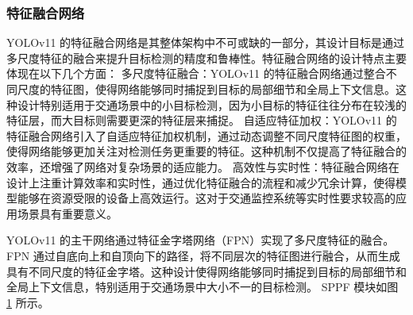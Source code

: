 \subsubsection{特征融合网络}

YOLOv11 的特征融合网络是其整体架构中不可或缺的一部分，其设计目标是通过多尺度特征的融合来提升目标检测的精度和鲁棒性。特征融合网络的设计特点主要体现在以下几个方面：
多尺度特征融合：YOLOv11 的特征融合网络通过整合不同尺度的特征图，使得网络能够同时捕捉到目标的局部细节和全局上下文信息。这种设计特别适用于交通场景中的小目标检测，因为小目标的特征往往分布在较浅的特征层，而大目标则需要更深的特征层来捕捉。
自适应特征加权：YOLOv11 的特征融合网络引入了自适应特征加权机制，通过动态调整不同尺度特征图的权重，使得网络能够更加关注对检测任务更重要的特征。这种机制不仅提高了特征融合的效率，还增强了网络对复杂场景的适应能力。
高效性与实时性：特征融合网络在设计上注重计算效率和实时性，通过优化特征融合的流程和减少冗余计算，使得模型能够在资源受限的设备上高效运行。这对于交通监控系统等实时性要求较高的应用场景具有重要意义。

YOLOv11 的主干网络通过特征金字塔网络（FPN）实现了多尺度特征的融合。FPN 通过自底向上和自顶向下的路径，将不同层次的特征图进行融合，从而生成具有不同尺度的特征金字塔。这种设计使得网络能够同时捕捉到目标的局部细节和全局上下文信息，特别适用于交通场景中大小不一的目标检测。
SPPF 模块如图 \ref{fig:sppf} 所示。
\begin{figure}[htb]
    \centering
    \captionsetup{font=footnotesize}
    \label{fig:sppf}
\end{figure}

